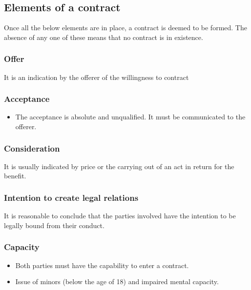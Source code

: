 \documentclass[11pt]{article}
\begin{document}
 \newpage

\subsection{Elements of a contract}
\label{sec:org7bf5f70}
Once all the below elements are in place, a contract is deemed to be formed. The absence of any one of these means that no contract is in existence.

\subsubsection{Offer}
\label{sec:orgd1bb644}
It is an indication by the offerer of the willingness to contract

\subsubsection{Acceptance}
\label{sec:org857c230}
\begin{itemize}
\item The acceptance is absolute and unqualified. It must be communicated to the offerer.
\end{itemize}

\subsubsection{Consideration}
\label{sec:org6b4b3f7}
It is usually indicated by price or the carrying out of an act in return for the benefit.

\subsubsection{Intention to create legal relations}
\label{sec:org9222c80}
It is reasonable to conclude that the parties involved have the intention to be legally bound from their conduct.

\subsubsection{Capacity}
\label{sec:orgbc95542}
\begin{itemize}
\item Both parties must have the capability to enter a contract.
\item Issue of minors (below the age of 18) and impaired mental capacity.
\end{itemize}
\end{document}
